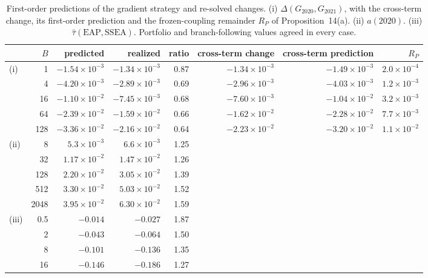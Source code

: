 \begin{table}[h]
\caption{First-order predictions of the gradient strategy and re-solved changes. (i) $\Delta(G_{2020},G_{2021})$, with the cross-term change, its first-order prediction and the frozen-coupling remainder $R_P$ of Proposition~14(a). (ii) $a(2020)$. (iii) $\hat\tau(\mathrm{EAP},\mathrm{SSEA})$. Portfolio and branch-following values agreed in every case.}\label{tab:sensacc}
\centering\footnotesize
\begin{tabular}{lrrrrrrr}
\toprule
 & $B$ & predicted & realized & ratio & cross-term change & cross-term prediction & $R_P$\\
\midrule
(i) & 1 & $-1.54\times10^{-3}$ & $-1.34\times10^{-3}$ & 0.87 & $-1.34\times10^{-3}$ & $-1.49\times10^{-3}$ & $2.0\times10^{-4}$\\
 & 4 & $-4.20\times10^{-3}$ & $-2.89\times10^{-3}$ & 0.69 & $-2.96\times10^{-3}$ & $-4.03\times10^{-3}$ & $1.2\times10^{-3}$\\
 & 16 & $-1.10\times10^{-2}$ & $-7.45\times10^{-3}$ & 0.68 & $-7.60\times10^{-3}$ & $-1.04\times10^{-2}$ & $3.2\times10^{-3}$\\
 & 64 & $-2.39\times10^{-2}$ & $-1.59\times10^{-2}$ & 0.66 & $-1.62\times10^{-2}$ & $-2.28\times10^{-2}$ & $7.7\times10^{-3}$\\
 & 128 & $-3.36\times10^{-2}$ & $-2.16\times10^{-2}$ & 0.64 & $-2.23\times10^{-2}$ & $-3.20\times10^{-2}$ & $1.1\times10^{-2}$\\
\addlinespace
(ii) & 8 & $5.3\times10^{-3}$ & $6.6\times10^{-3}$ & 1.25 & & & \\
 & 32 & $1.17\times10^{-2}$ & $1.47\times10^{-2}$ & 1.26 & & & \\
 & 128 & $2.20\times10^{-2}$ & $3.05\times10^{-2}$ & 1.39 & & & \\
 & 512 & $3.30\times10^{-2}$ & $5.03\times10^{-2}$ & 1.52 & & & \\
 & 2048 & $3.95\times10^{-2}$ & $6.30\times10^{-2}$ & 1.59 & & & \\
\addlinespace
(iii) & 0.5 & $-0.014$ & $-0.027$ & 1.87 & & & \\
 & 2 & $-0.043$ & $-0.064$ & 1.50 & & & \\
 & 8 & $-0.101$ & $-0.136$ & 1.35 & & & \\
 & 16 & $-0.146$ & $-0.186$ & 1.27 & & & \\
\bottomrule
\end{tabular}
\end{table}

